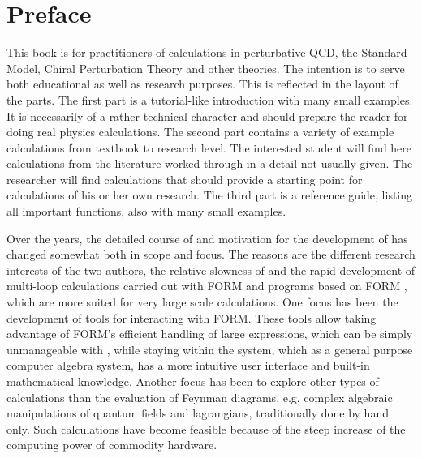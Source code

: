 \section*{Preface}

This book is for practitioners of calculations in perturbative QCD,
the Standard Model, Chiral Perturbation Theory and other theories.
The intention is to serve both educational as well as research purposes.
This is reflected in the layout of the parts.
The first part is a tutorial-like introduction with many small examples.
It is necessarily of a rather technical character and should prepare the
reader for doing real physics calculations.
The second part contains a variety of example calculations from textbook
to research level. The interested student will find here calculations 
from the literature worked through in a detail not usually given.
The researcher will find calculations that should provide a starting point
for calculations of his or her own research.
The third part is a reference guide, listing all important functions,
also with many small examples.

Over the years, the detailed course of and motivation for the development of \fc has
changed somewhat both in scope and focus. The reasons are the different research
interests of the two authors, the relative slowness of \mma and the rapid development of
multi-loop calculations carried out with FORM and programs based on FORM 
\cite{Vermaseren:2000nd, Hahn:1998yk}, which are  more suited for very large scale calculations.
One focus has been the development of \fc tools for interacting with FORM. These tools allow
taking advantage of FORM's efficient handling of large expressions, which can be simply
unmanageable with \mma, while staying within the \mma system, which as a
general purpose computer algebra system, has a more intuitive
user interface and built-in mathematical knowledge.
Another focus has been to explore other types of calculations than the evaluation of Feynman
diagrams, e.g. complex algebraic manipulations of quantum fields and lagrangians, traditionally done by hand only.
Such calculations have become feasible because of the steep increase of the computing
power of commodity hardware.

